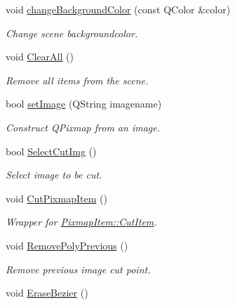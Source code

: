 \begin{DoxyCompactItemize}
void \mbox{\hyperlink{classOwnGraphicsScene_abf700184c967b526194bfab096396850}{change\+Background\+Color}} (const Q\+Color \&color)
\begin{DoxyCompactList}\small\item\em Change scene backgroundcolor. \end{DoxyCompactList}\item 
\mbox{\label{classOwnGraphicsScene_a8d133a1b72a853772d2d89da4d4e1afa}} 
void \mbox{\hyperlink{classOwnGraphicsScene_a8d133a1b72a853772d2d89da4d4e1afa}{Clear\+All}} ()
\begin{DoxyCompactList}\small\item\em Remove all items from the scene. \end{DoxyCompactList}\item 
\mbox{\label{classOwnGraphicsScene_ae83ee24e342b50c335af155a34295185}} 
bool \mbox{\hyperlink{classOwnGraphicsScene_ae83ee24e342b50c335af155a34295185}{set\+Image}} (Q\+String imagename)
\begin{DoxyCompactList}\small\item\em Construct Q\+Pixmap from an image. \end{DoxyCompactList}\item 
bool \mbox{\hyperlink{classOwnGraphicsScene_ae79aa179ce90ab26f06d7d17eed96b93}{Select\+Cut\+Img}} ()
\begin{DoxyCompactList}\small\item\em Select image to be cut. \end{DoxyCompactList}\item 
void \mbox{\hyperlink{classOwnGraphicsScene_a7e3d97c27cca1df796b75cc4a99e24cd}{Cut\+Pixmap\+Item}} ()
\begin{DoxyCompactList}\small\item\em Wrapper for \mbox{\hyperlink{classPixmapItem_a4a742318dce01d018da2f4b01790c210}{Pixmap\+Item\+::\+Cut\+Item}}. \end{DoxyCompactList}\item 
void \mbox{\hyperlink{classOwnGraphicsScene_a4976a8e6f682612acd3e23b6c98bd8d8}{Remove\+Poly\+Previous}} ()
\begin{DoxyCompactList}\small\item\em Remove previous image cut point. \end{DoxyCompactList}\item 
void \mbox{\hyperlink{classOwnGraphicsScene_a7b205ba3c4db5e88f60f1f327175b5b6}{Erase\+Bezier}} ()

\end{DoxyCompactItemize}
